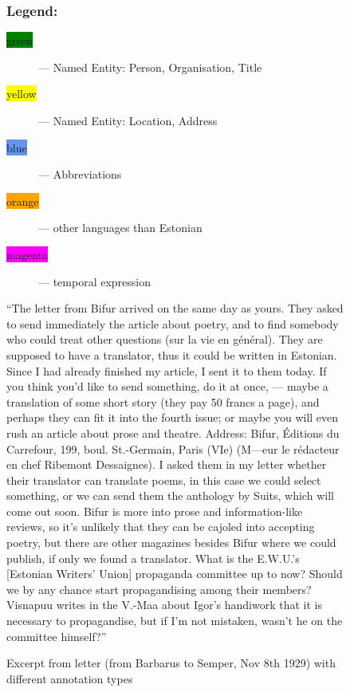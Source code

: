 \documentclass[runningheads]{llncs}
\begin{document}
\begin{figure}
\begin{minipage}{0.9\textwidth}
    \subsubsection{Legend:}
    \begin{description}
\item[\colorbox{Green}{green}] --- Named Entity: Person, Organisation, Title
\item[\colorbox{Yellow}{yellow}] --- Named Entity: Location, Address
\item[\colorbox{CornflowerBlue}{blue}] --- Abbreviations
\item[\colorbox{Orange}{orange}] --- other languages than Estonian
\item[\colorbox{Magenta}{magenta}] --- temporal expression
\end{description}
\end{minipage}
\begin{minipage}{0.9\textwidth}
  \vspace{18pt}
  ``The letter from Bifur arrived on the same day as yours. They asked to send immediately the article about poetry, and to find somebody who could treat other questions (sur la vie en g\'en\'eral). They are supposed to have a translator, thus it could be written in Estonian. Since I had already finished my article, I sent it to them today. If you think you’d like to send something, do it at once, --- maybe a translation of some short story (they pay 50 francs a page), and perhaps they can fit it into the fourth issue; or maybe you will even rush an article about prose and theatre. Address: Bifur, \'Editions du Carrefour, 199, boul. St.-Germain, Paris (VIe) (M---eur le r\'edacteur en chef Ribemont Dessaignes). I asked them in my letter whether their translator can translate poems, in this case we could select something, or we can send them the anthology by Suits, which will come out soon. Bifur is more into prose and information-like reviews, so it's unlikely that they can be cajoled into accepting poetry, but there are other magazines besides Bifur where we could publish, if only we found a translator. What is the E.W.U.'s [Estonian Writers' Union] propaganda committee up to now? Should we by any chance start propagandising among their members? Visnapuu writes in the V.-Maa about Igor's handiwork that it is necessary to propagandise, but if I'm not mistaken, wasn't he on the committee himself?''
  \end{minipage}
  \caption{Excerpt from letter (from Barbarus to Semper, Nov 8th 1929) with different annotation types}\label{fig1}
\end{figure}
\end{document}
